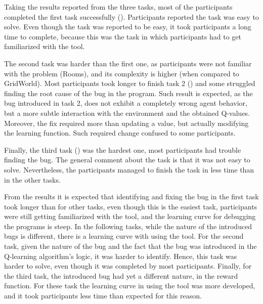 Taking the results reported from the three tasks, most of the participants completed the first task successfully (). Participants reported the task was easy to solve. Even though the task 
was reported to be easy, it took participants a long time to complete, because this was the task in 
which participants had to get familiarized with the tool. 

The second task was harder than the first one, as participants were not familiar with the problem 
(\ie Rooms), and its complexity is higher (when compared to GridWorld). Most participants took 
longer to finish task 2 () and some struggled finding the root cause of the bug in the 
program.  Such result is expected, as the bug introduced in task 2, does not exhibit a completely 
wrong agent behavior, but a more subtle interaction with the environment and the obtained Q-values. 
Moreover, the fix required more than updating a value, but actually modifying the learning function. 
Such required change confused to some participants. 

Finally, the third task () was the hardest one, most participants had trouble finding the 
bug. The general comment about the task is that it was not easy to solve. Nevertheless, the 
participants managed to finish the task in less time than in the other tasks. 

From the results it is expected that identifying and fixing the bug in the first task took longer than for 
other tasks, even though this is the easiest task, participants were still getting familiarized with the 
tool, and the learning curve for debugging the programs is steep. In the following tasks, while the 
nature of the introduced bugs is different, there is a learning curve  with using the tool. For the second 
task, given the nature of the bug and the fact that the bug was introduced in the Q-learning algorithm's 
logic, it was harder to identify. Hence, this task was harder to solve, even though it was completed by 
most participants. Finally, for the third task, the introduced bug had yet a different nature, in the reward 
function. For these task the learning curve in using the tool was more developed, and it took 
participants less time than expected for this reason.


